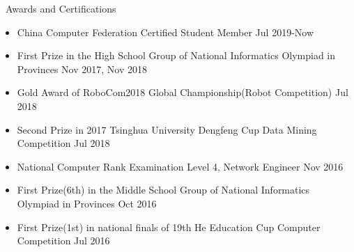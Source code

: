 \documentclass{resume} %
\begin{document}
\begin{rSection}{\faAward~Awards and Certifications}
    
    \begin{itemize}
        \itemsep -0.5em \vspace{-0.5em}

        \item China Computer Federation Certified Student Member \hfill Jul 2019-Now

        \item First Prize in the High School Group of National Informatics Olympiad in Provinces \hfill Nov 2017, Nov 2018
        \item Gold Award of RoboCom2018 Global Championship(Robot Competition) \hfill Jul 2018
        \item Second Prize in 2017 Tsinghua University Dengfeng Cup Data Mining Competition \hfill Jul 2018
        \item National Computer Rank Examination Level 4, Network Engineer \hfill Nov 2016
        \item First Prize(6th) in the Middle School Group of National Informatics Olympiad in Provinces \hfill Oct 2016
        \item First Prize(1st) in national finals of 19th He Education Cup Computer Competition \hfill Jul 2016
        
    \end{itemize}
\end{rSection}
\end{document}
